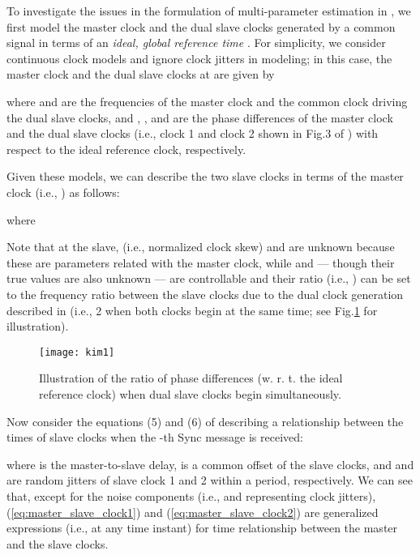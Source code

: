 \documentclass[journal,twoside,final]{IEEEtran}
\begin{document}
To investigate the issues in the formulation of multi-parameter estimation in
\cite{chin09:_ieee}, we first model the master clock and the dual slave clocks
generated by a common signal in terms of an \emph{ideal, global reference time}
.
For simplicity, we consider continuous clock models and ignore clock jitters in
modeling; in this case, the master clock and the dual slave clocks at  are
given by
\begingroup
\setlength{\arraycolsep}{0.0em}

\endgroup
where  and  are the frequencies of the master clock and the common
clock driving the dual slave clocks, and , , and
 are the phase differences of the master clock and the dual slave
clocks (i.e., clock 1 and clock 2 shown in Fig.3
of \cite{chin09:_ieee}) with respect to the ideal reference clock, respectively.

Given these models, we can describe the two slave clocks in terms of the master
clock (i.e., ) as follows:
\begingroup
\setlength{\arraycolsep}{0.0em}

\endgroup
where
\begingroup
\setlength{\arraycolsep}{0.0em}

\endgroup
Note that at the slave,  (i.e., normalized clock skew) and
 are unknown because these are parameters related with the master
clock, while  and  --- though their true values are
also unknown --- are controllable and their ratio (i.e.,
) can be set to the frequency ratio between the slave
clocks due to the dual clock generation described in \cite{chin09:_ieee} (i.e.,
2 when both clocks begin at the same time; see Fig.\ref{fg:phase_ratio}
for illustration).
\newlength{\figwidth} \setlength{\figwidth}{.65\linewidth}
\begin{figure}[!t]
  \begin{center}
    \texttt{[image: kim1]}
  \end{center}
  \caption{Illustration of the ratio of phase differences (w. r. t. the ideal
    reference clock) when dual slave clocks begin simultaneously.}
  \label{fg:phase_ratio}
\end{figure}

Now consider the equations (5) and (6) of \cite{chin09:_ieee} describing a
relationship between the times of slave clocks when the -th Sync message is
received:
\begingroup
\setlength{\arraycolsep}{0.0em}

\endgroup
where  is the master-to-slave delay,  is a common offset of the
slave clocks, and  and  are random jitters of slave
clock 1 and 2 within a period, respectively. We can see that, except for the
noise components (i.e.,  and  representing clock
jitters), (\ref{eq:master_slave_clock1}) and (\ref{eq:master_slave_clock2}) are
generalized expressions (i.e., at any time instant) for time relationship
between the master and the slave clocks.
\end{document}
